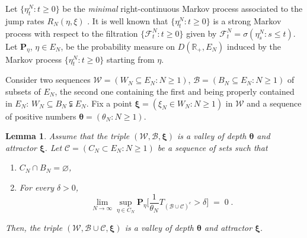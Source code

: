 \documentclass[reqno]{amsart}
\newtheorem{lemma}[theorem]{Lemma}
\begin{document}
Let $\{\eta^N_t : t\ge 0\}$ be the {\sl minimal} right-continuous
Markov process associated to the jump rates $R_N(\eta,\xi)$ \cite{n}.
It is well known that $\{\eta^N_t : t\ge 0\}$ is a strong Markov
process with respect to the filtration $\{{{\mathcal F}}^N_t : t\ge 0\}$ given
by ${{\mathcal F}}^N_t = \sigma (\eta^N_s : s\le t)$. Let ${{\mathbf P}}_{\eta}$,
$\eta\in E_N$, be the probability measure on $D({{\mathbb R}}_+,E_N)$ induced
by the Markov process $\{\eta^N_t : t\ge 0\}$ starting from $\eta$.

Consider two sequences ${{\mathscr W}} = (W_N\subseteq E_N : N\ge 1)$, ${{\mathscr B}} =
(B_N \subseteq E_N : N\ge 1)$ of subsets of $E_N$, the second one
containing the first and being properly contained in $E_N$: $W_N
\subseteq B_N \subsetneqq E_N$.  Fix a point ${{\boldsymbol \xi}} = (\xi_N \in W_N
: N\ge 1)$ in ${{\mathscr W}}$ and a sequence of positive numbers ${{\boldsymbol \theta}} =
(\theta_N : N\ge 1)$.

\begin{lemma}
\label{s04}
Assume that the triple $({{\mathscr W}}, {{\mathscr B}}, {{\boldsymbol \xi}})$ is a valley of depth
${{\boldsymbol \theta}}$ and attractor ${{\boldsymbol \xi}}$. Let ${{\mathscr C}} = (C_N \subset E_N :
N\ge 1)$ be a sequence of sets such that
\begin{enumerate}
\item $C_N \cap B_N = \varnothing$,

\item For every $\delta>0$,
\begin{equation}
\label{03}
\lim_{N\to\infty}
\sup_{\eta\in C_N} {{\mathbf P}}_{\eta} \Big[ \frac 1{\theta_N} T_{({{\mathscr B}} \cup
  {{\mathscr C}})^c} > \delta \Big] \;=\; 0\; .
\end{equation}
\end{enumerate}
Then, the triple $({{\mathscr W}}, {{\mathscr B}} \cup {{\mathscr C}}, {{\boldsymbol \xi}})$ is a
valley of depth ${{\boldsymbol \theta}}$ and attractor ${{\boldsymbol \xi}}$.
\end{lemma}
\end{document}
